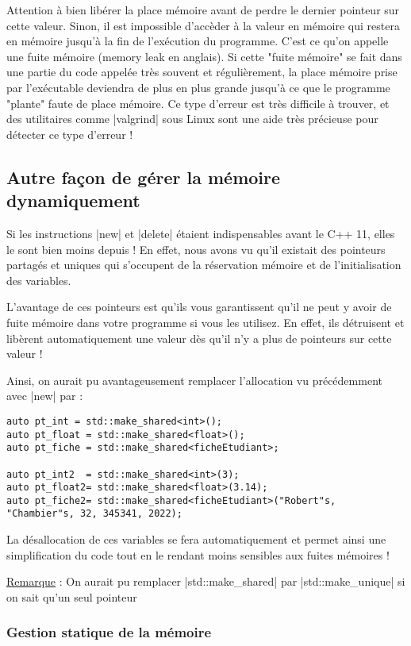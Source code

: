 Attention à bien libérer la place mémoire avant de perdre le dernier pointeur sur cette valeur. Sinon, il est impossible
d'accèder à la valeur en mémoire qui restera en mémoire jusqu'à la fin de l'exécution du programme. C'est ce qu'on appelle
une fuite mémoire (memory leak en anglais). Si cette "fuite mémoire" se fait dans une partie du code appelée très souvent et
régulièrement, la place mémoire prise par l'exécutable deviendra de plus en plus grande jusqu'à ce que le programme "plante" faute de place mémoire. Ce type d'erreur est très difficile à trouver, et des utilitaires comme |valgrind| sous Linux sont une aide très précieuse pour détecter ce type d'erreur !

\subsection{Autre façon de gérer la mémoire dynamiquement}

Si les instructions |new| et |delete| étaient indispensables avant le C++ 11, elles le sont bien moins depuis !
En effet, nous avons vu qu'il existait des pointeurs partagés et uniques qui s'occupent de la réservation mémoire
et de l'initialisation des variables.

L'avantage de ces pointeurs est qu'ils vous garantissent qu'il ne peut y avoir de fuite mémoire dans votre programme si vous les utilisez. En effet, ils détruisent et libèrent automatiquement une valeur dès qu'il n'y a plus de pointeurs sur cette valeur !

Ainsi, on aurait pu avantageusement remplacer l'allocation vu précédemment avec |new| par :
\begin{lstlisting}
auto pt_int = std::make_shared<int>(); 
auto pt_float = std::make_shared<float>();
auto pt_fiche = std::make_shared<ficheEtudiant>;

auto pt_int2  = std::make_shared<int>(3);
auto pt_float2= std::make_shared<float>(3.14);
auto pt_fiche2= std::make_shared<ficheEtudiant>("Robert"s, "Chambier"s, 32, 345341, 2022);
\end{lstlisting}

La désallocation de ces variables se fera automatiquement et permet ainsi une simplification du code tout en le rendant
moins sensibles aux fuites mémoires !

\underline{Remarque} : On aurait pu remplacer |std::make_shared| par |std::make_unique| si on sait qu'un seul pointeur


\subsubsection{Gestion statique de la mémoire}

